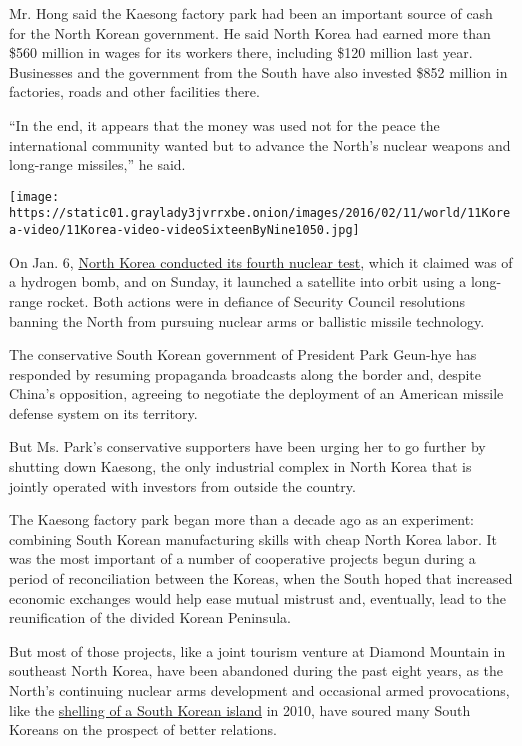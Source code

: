 Mr. Hong said the Kaesong factory park had been an important source of
cash for the North Korean government. He said North Korea had earned
more than \$560 million in wages for its workers there, including \$120
million last year. Businesses and the government from the South have
also invested \$852 million in factories, roads and other facilities
there.

``In the end, it appears that the money was used not for the peace the
international community wanted but to advance the North's nuclear
weapons and long-range missiles,'' he said.

\texttt{[image: https://static01.graylady3jvrrxbe.onion/images/2016/02/11/world/11Korea-video/11Korea-video-videoSixteenByNine1050.jpg]}

On Jan. 6,
\href{http://www.nytimes3xbfgragh.onion/2016/01/06/world/asia/north-korea-hydrogen-bomb-test.html}{North
Korea conducted its fourth nuclear test}, which it claimed was of a
hydrogen bomb, and on Sunday, it launched a satellite into orbit using a
long-range rocket. Both actions were in defiance of Security Council
resolutions banning the North from pursuing nuclear arms or ballistic
missile technology.

The conservative South Korean government of President Park Geun-hye has
responded by resuming propaganda broadcasts along the border and,
despite China's opposition, agreeing to negotiate the deployment of an
American missile defense system on its territory.

But Ms. Park's conservative supporters have been urging her to go
further by shutting down Kaesong, the only industrial complex in North
Korea that is jointly operated with investors from outside the country.

The Kaesong factory park began more than a decade ago as an experiment:
combining South Korean manufacturing skills with cheap North Korea
labor. It was the most important of a number of cooperative projects
begun during a period of reconciliation between the Koreas, when the
South hoped that increased economic exchanges would help ease mutual
mistrust and, eventually, lead to the reunification of the divided
Korean Peninsula.

But most of those projects, like a joint tourism venture at Diamond
Mountain in southeast North Korea, have been abandoned during the past
eight years, as the North's continuing nuclear arms development and
occasional armed provocations, like the
\href{http://www.nytimes3xbfgragh.onion/2010/11/24/world/asia/24korea.html}{shelling
of a South Korean island} in 2010, have soured many South Koreans on the
prospect of better relations.

